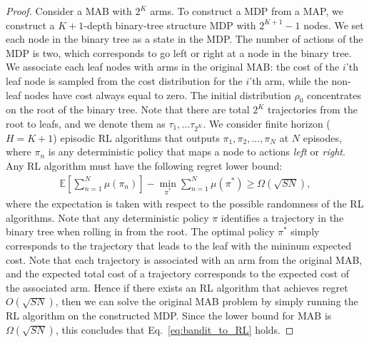 \documentclass{article}
\begin{document}
\begin{proof}
Consider a MAB with $2^{K}$ arms. To construct a MDP from a MAP, we construct a $K+1$-depth binary-tree structure MDP with $2^{K+1}-1$ nodes. We set each node in the binary tree as a state in the MDP. The number of actions of the MDP is two, which corresponds to go left or right at a node in the binary tree. We associate each leaf nodes with arms in the original MAB: the cost of the $i$'th leaf node is sampled from the cost distribution for the $i$'th arm, while the non-leaf nodes have cost always equal to zero. The initial distribution $\rho_0$ concentrates on the root of the binary tree. Note that there are total $2^K$ trajectories from the root to leafs, and we denote them as $\tau_1,...\tau_{2^K}$. We consider finite horizon ($H=K+1$) episodic RL algorithms that outputs $\pi_1,\pi_2,...,\pi_N$ at $N$ episodes, where $\pi_n$ is any deterministic policy that maps a node to actions \emph{left} or \emph{right}. Any RL algorithm must have the following regret lower bound:
\begin{align}
\label{eq:bandit_to_RL}
\mathbb{E}[\sum_{n=1}^N \mu(\pi_n)] - \min_{\pi^*}\sum_{n=1}^N \mu(\pi^*) \geq \Omega(\sqrt{SN}),
\end{align} where the expectation is taken with respect to the possible randomness of the RL algorithms. Note that any deterministic policy $\pi$ identifies a trajectory in the binary tree when rolling in from the root. The optimal policy $\pi^*$ simply corresponds to the trajectory that leads to the leaf with the mininum expected cost. Note that each trajectory is associated with an arm from the original MAB, and the expected total cost of a trajectory corresponds to the expected cost of the associated arm. Hence if there exists an RL algorithm that achieves regret $O(\sqrt{SN})$, then we can solve the original MAB problem by simply running the RL algorithm on the constructed MDP. Since the lower bound for MAB is $\Omega(\sqrt{SN})$, this concludes that Eq.~\ref{eq:bandit_to_RL} holds. 
\end{proof}
\end{document}
